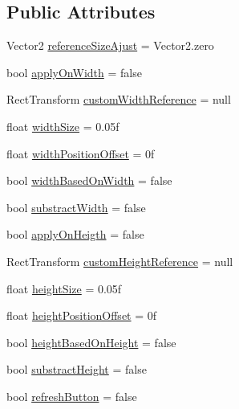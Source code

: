 \subsection*{Public Attributes}
\begin{DoxyCompactItemize}
\item 
Vector2 \hyperlink{class_u_i_rect_transform_size_controller_a92c5c0ef5d53a836bf6e9a2389b9d015}{reference\+Size\+Ajust} = Vector2.\+zero
\item 
bool \hyperlink{class_u_i_rect_transform_size_controller_a1a159e99c9cdbedfbb35a9e10f80bf8b}{apply\+On\+Width} = false
\item 
Rect\+Transform \hyperlink{class_u_i_rect_transform_size_controller_addd68c45dde692acf708e8fa0f1ff2dd}{custom\+Width\+Reference} = null
\item 
float \hyperlink{class_u_i_rect_transform_size_controller_aaae3387fd0671f123188b0501e7c5cf9}{width\+Size} = 0.\+05f
\item 
float \hyperlink{class_u_i_rect_transform_size_controller_af5edbd7776f7b44ffbde39d3927ed595}{width\+Position\+Offset} = 0f
\item 
bool \hyperlink{class_u_i_rect_transform_size_controller_a18d489fe4ee7dce1e8df97206f46a81d}{width\+Based\+On\+Width} = false
\item 
bool \hyperlink{class_u_i_rect_transform_size_controller_a890fff1c7e2fe9a6716636bbee5208d9}{substract\+Width} = false
\item 
bool \hyperlink{class_u_i_rect_transform_size_controller_a31ffb886afe3b9ad5f3f841f0fb1b551}{apply\+On\+Heigth} = false
\item 
Rect\+Transform \hyperlink{class_u_i_rect_transform_size_controller_a0f476c5133fc2c9b4d8cceb6d0982c5d}{custom\+Height\+Reference} = null
\item 
float \hyperlink{class_u_i_rect_transform_size_controller_ad82b0124ff94310c9cff5496ad9734c4}{height\+Size} = 0.\+05f
\item 
float \hyperlink{class_u_i_rect_transform_size_controller_a48b9b1560c1861913e95287e68e87b0f}{height\+Position\+Offset} = 0f
\item 
bool \hyperlink{class_u_i_rect_transform_size_controller_a45277058d93983da726434e711284053}{height\+Based\+On\+Height} = false
\item 
bool \hyperlink{class_u_i_rect_transform_size_controller_a89b614c35f1e2608207a5a7ab49603a8}{substract\+Height} = false
\item 
bool \hyperlink{class_u_i_rect_transform_size_controller_ac16abee1e08fcf87fffc6c9a722b3bc9}{refresh\+Button} = false
\end{DoxyCompactItemize}


